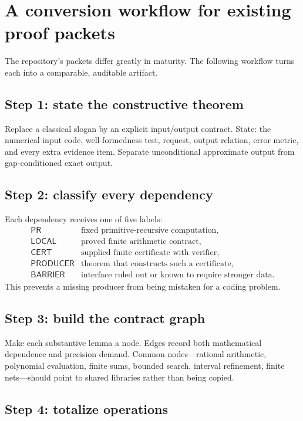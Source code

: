 \section{A conversion workflow for existing proof packets}

The repository's packets differ greatly in maturity.  The following workflow
turns each into a comparable, auditable artifact.

\subsection{Step 1: state the constructive theorem}

Replace a classical slogan by an explicit input/output contract.  State:
the numerical input code, well-formedness test, request, output relation,
error metric, and every extra evidence item.  Separate unconditional
approximate output from gap-conditioned exact output.

\subsection{Step 2: classify every dependency}

Each dependency receives one of five labels:
\[
\begin{array}{ll}
\mathsf{PR}&\text{fixed primitive-recursive computation},\\
\mathsf{LOCAL}&\text{proved finite arithmetic contract},\\
\mathsf{CERT}&\text{supplied finite certificate with verifier},\\
\mathsf{PRODUCER}&\text{theorem that constructs such a certificate},\\
\mathsf{BARRIER}&\text{interface ruled out or known to require stronger data}.
\end{array}
\]
This prevents a missing producer from being mistaken for a coding problem.

\subsection{Step 3: build the contract graph}

Make each substantive lemma a node.  Edges record both mathematical
dependence and precision demand.  Common nodes---rational arithmetic,
polynomial evaluation, finite sums, bounded search, interval refinement,
finite nets---should point to shared libraries rather than being copied.

\subsection{Step 4: totalize operations}

